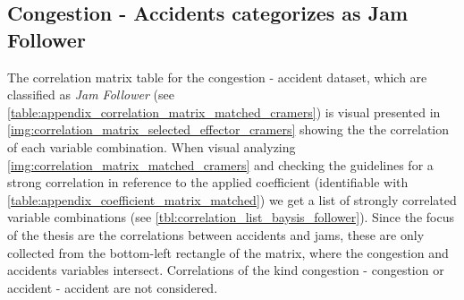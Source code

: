 \subsection{Congestion - Accidents categorizes as Jam Follower}
\label{analysis_processing_correlation_baysis_follower}
The correlation matrix table for the congestion - accident dataset, which are classified as \textit{Jam Follower} (see \cref{table:appendix_correlation_matrix_matched_cramers}) is visual presented in \cref{img:correlation_matrix_selected_effector_cramers} showing the the correlation of each variable combination. When visual analyzing \cref{img:correlation_matrix_matched_cramers} and checking the guidelines for a strong correlation in reference to the applied coefficient (identifiable with \cref{table:appendix_coefficient_matrix_matched}) we get a list of strongly correlated variable combinations (see \cref{tbl:correlation_list_baysis_follower}). Since the focus of the thesis are the correlations between accidents and jams, these are only collected from the bottom-left rectangle of the matrix, where the congestion and accidents variables intersect. Correlations of the kind congestion - congestion or accident - accident are not considered.
